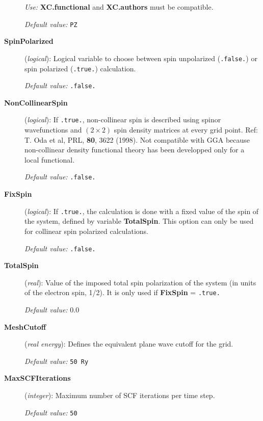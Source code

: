 \documentclass[11pt]{article}
\begin{document}
\begin{description}
{\it Use:} {\bf XC.functional} and {\bf XC.authors} must be compatible.

{\it Default value:} {\tt PZ}


\item[{\bf SpinPolarized}] ({\it logical}): 
Logical variable to choose between spin unpolarized ({\tt .false.}) 
or spin polarized ({\tt .true.}) calculation.

{\it Default value:} {\tt .false.}


\item[{\bf NonCollinearSpin}] ({\it logical}): 
If {\tt .true.}, non-collinear spin is described using spinor wavefunctions
and $(2 \times 2)$ spin density matrices at every grid point.
Ref: T. Oda et al, PRL, {\bf 80}, 3622 (1998).
Not compatible with GGA because non-collinear density functional
theory has been developped only for a local functional.

{\it Default value:} {\tt .false.}


\item[{\bf FixSpin}] ({\it logical}): 
If {\tt .true.}, the calculation is done with a fixed value of the
spin of the system, defined by variable  {\bf TotalSpin}.
This option can only be used for collinear spin polarized
calculations.

{\it Default value:} {\tt .false.}

\item[{\bf TotalSpin}] ({\it real}):
Value of the imposed total spin polarization of the system (in units of the
electron spin, 1/2). It is only used
if {\bf FixSpin} = {\tt .true.}

{\it Default value:} 0.0

\item[{\bf MeshCutoff}] ({\it real energy}): 
Defines the equivalent plane wave cutoff for the grid.

{\it Default value:} {\tt 50 Ry}

\item[{\bf MaxSCFIterations}] ({\it integer}): 
Maximum number of SCF iterations per time step.

{\it Default value:} {\tt 50}


\end{description}
\end{document}
